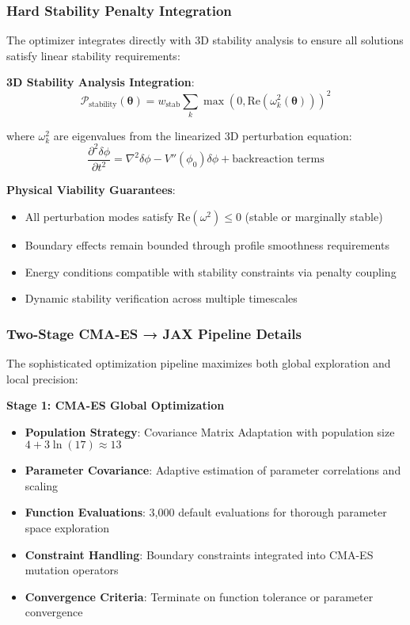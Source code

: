 \documentclass[12pt,a4paper]{article}
\begin{document}
\subsubsection{Hard Stability Penalty Integration}

The optimizer integrates directly with 3D stability analysis to ensure all solutions satisfy linear stability requirements:

\textbf{3D Stability Analysis Integration}:
\begin{equation}
\mathcal{P}_{\text{stability}}(\boldsymbol{\theta}) = w_{\text{stab}} \sum_{k} \max(0, \text{Re}(\omega_k^2(\boldsymbol{\theta})))^2
\end{equation}

where $\omega_k^2$ are eigenvalues from the linearized 3D perturbation equation:
\begin{equation}
\frac{\partial^2 \delta\phi}{\partial t^2} = \nabla^2 \delta\phi - V''(\phi_0) \delta\phi + \text{backreaction terms}
\end{equation}

\textbf{Physical Viability Guarantees}:
\begin{itemize}
\item All perturbation modes satisfy $\text{Re}(\omega^2) \leq 0$ (stable or marginally stable)
\item Boundary effects remain bounded through profile smoothness requirements
\item Energy conditions compatible with stability constraints via penalty coupling
\item Dynamic stability verification across multiple timescales
\end{itemize}

\subsubsection{Two-Stage CMA-ES → JAX Pipeline Details}

The sophisticated optimization pipeline maximizes both global exploration and local precision:

\textbf{Stage 1: CMA-ES Global Optimization}
\begin{itemize}
\item \textbf{Population Strategy}: Covariance Matrix Adaptation with population size $4 + 3\ln(17) \approx 13$
\item \textbf{Parameter Covariance}: Adaptive estimation of parameter correlations and scaling
\item \textbf{Function Evaluations}: 3,000 default evaluations for thorough parameter space exploration
\item \textbf{Constraint Handling}: Boundary constraints integrated into CMA-ES mutation operators
\item \textbf{Convergence Criteria}: Terminate on function tolerance or parameter convergence
\end{itemize}
\end{document}
